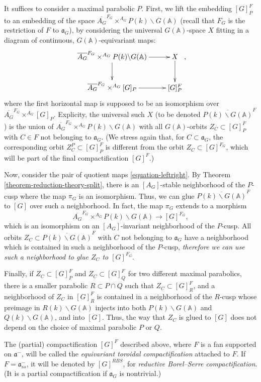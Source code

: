 It suffices to consider a maximal parabolic $P$. 
First, we lift the embedding $[G]_P^{F}$ to an embedding of the space $\overline{A_G}^{F_G} \times^{A_G} P(k)\backslash G(\mathbb A)$ (recall that $F_G$ is the restriction of $F$ to $\mathfrak a_G$), by considering the universal $G(\mathbb A)$-space $X$ fitting in a diagram of continuous, $G(\mathbb A)$-equivariant maps:
$$ \xymatrix{\overline{A_G}^{F_G} \times^{A_G} P(k)\backslash G(\mathbb A) \ar[d] \ar[r] & X \ar[d] \\ \overline{A_G}^{F_G} \times^{A_G} [G]_P \ar[r] & [G]_P^F},$$
where the first horizontal map is supposed to be an isomorphism over $\overline{A_G}^{F_G} \times^{A_G} [G]_P$.
Explicity, the universal such $X$ (to be denoted $\overline{P(k)\backslash G(\mathbb A)}^F$) is the union of $\overline{A_G}^{F_G} \times^{A_G} P(k)\backslash G(\mathbb A)$ with all $G(\mathbb A)$-orbits $Z_C\subset [G]_P^F$ with $C\in F$ not belonging to $\mathfrak a_G$. (We stress again that, for $C\subset \mathfrak a_G$, the corresponding orbit $Z_C^P\subset [G]_P^F$ is different from the orbit $Z_C \subset [G]^{F_G}$, which will be part of the final compactification $[G]^F$.)

Now, consider the pair of quotient maps \eqref{equation-leftright}. By Theorem \ref{theorem-reduction-theory-split}, there is an $[A_G]$-stable neighborhood of the $P$-cusp where the map $\pi_G$ is an isomorphism. Thus, we can glue $\overline{P(k)\backslash G(\mathbb A)}^F$ to $[G]$ over such a neighborhood. In fact, the map $\pi_G$ extends to a morphism 
$$ \overline{A_G}^{F_G} \times^{A_G} P(k)\backslash G(\mathbb A) \to [G]^{F_G},$$
which is an isomorphism on an $[A_G]$-invariant neighborhood of the $P$-cusp. All orbits $Z_C\subset \overline{P(k)\backslash G(\mathbb A)}^F$ with $C$ not belonging to $\mathfrak a_G$ have a neighborhood which is contained in such a neighborhood of the $P$-cusp, \emph{therefore we can use such a neighborhood to glue $Z_C$ to $[G]^{F_G}$}. 

Finally, if $Z_C\subset [G]_P^F$ and $Z_C\subset [G]_Q^F$ for two different maximal parabolics, there is a smaller parabolic $R\subset P\cap Q$ such that $Z_C\subset [G]_R^F$, and a neighborhood of $Z_C$ in $[G]_R^F$ is contained in a neighborhood of the $R$-cusp whose preimage in $R(k)\backslash G(\mathbb A)$ injects into both $P(k)\backslash G(\mathbb A)$ and $Q(k)\backslash G(\mathbb A)$, and into $[G]$. Thus, the way that $Z_C$ is glued to $[G]$ does not depend on the choice of maximal parabolic $P$ or $Q$.

\begin{definition}
 \label{definition-equivariant-toroidal-compactification}
The (partial) compactification $[G]^F$ described above, where $F$ is a fan supported on $\mathfrak a^-$, will be called the {\it equivariant toroidal compactification} attached to $F$. If $F=\mathfrak a^-_{ss}$, it will be denoted by $[G]^{RBS}$, for {\it reductive Borel--Serre compactification}. (It is a partial compactification if $\mathfrak a_G$ is nontrivial.)
\end{definition}

